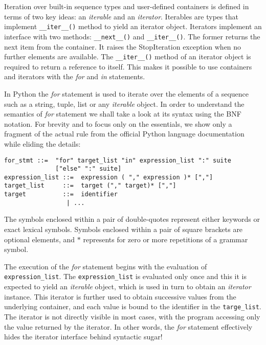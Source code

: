 \documentclass[10pt, a4paper]{article}
\begin{document}
Iteration over built-in sequence types and user-defined containers is defined in terms of two key ideas: an \textit{iterable} and an \textit{iterator}. Iterables are types that implement \texttt{\_\_iter\_\_()} method to yield an iterator object. Iterators implement an interface with two methods: \texttt{\_\_next\_\_()} and  \texttt{\_\_iter\_\_()}. The former returns the next item from the container. It raises the StopIteration exception when no further elements are available. The \texttt{\_\_iter\_\_()} method of an iterator object is required to return a reference to itself. This makes it possible to use containers and iterators with the \textit{for} and \textit{in} statements.

In Python the \textit{for} statement is used to iterate over the elements of a sequence such as a string, tuple, list or any \textit{iterable} object. In order to understand the semantics of \textit{for} statement we shall take a look at its syntax using the BNF notation. For brevity and to focus only on the essentials, we show only a fragment of the actual rule from the official Python language documentation while eliding the details:

{\begin{verbatim}
for_stmt ::=  "for" target_list "in" expression_list ":" suite
              ["else" ":" suite]
expression_list ::=  expression ( "," expression )* [","]
target_list     ::=  target ("," target)* [","]
target          ::=  identifier
                 | ...
\end{verbatim}}

The symbols enclosed within a pair of double-quotes represent either keywords or exact lexical symbols. Symbols enclosed within a pair of square brackets are optional elements, and $\ast$ represents for zero or more repetitions of a grammar symbol.

The execution of the \textit{for} statement begins with the evaluation of \texttt{expression\_list}. The \texttt{expression\_list} is evaluated only once and this it is expected to yield an \textit{iterable} object, which is used in turn to obtain an \textit{iterator} instance. This iterator is further used to obtain successive values from the underlying container, and each value is bound to the identifier in the \texttt{targe\_list}. The iterator is not directly visible in most cases, with the program accessing only the value returned by the iterator. In other words, the \textit{for} statement effectively hides the iterator interface behind syntactic sugar!
\end{document}
